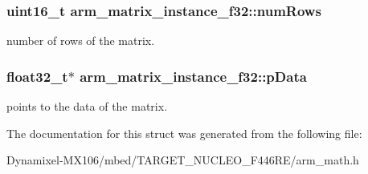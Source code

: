\subsubsection[{\texorpdfstring{num\+Rows}{numRows}}]{\setlength{\rightskip}{0pt plus 5cm}uint16\+\_\+t arm\+\_\+matrix\+\_\+instance\+\_\+f32\+::num\+Rows}\hypertarget{structarm__matrix__instance__f32_a23f4e34d70a82c9cad7612add5640b7b}{}\label{structarm__matrix__instance__f32_a23f4e34d70a82c9cad7612add5640b7b}
number of rows of the matrix. 
\subsubsection[{\texorpdfstring{p\+Data}{pData}}]{\setlength{\rightskip}{0pt plus 5cm}float32\+\_\+t$\ast$ arm\+\_\+matrix\+\_\+instance\+\_\+f32\+::p\+Data}\hypertarget{structarm__matrix__instance__f32_af3917c032600a9dfd5ed4a96f074910a}{}\label{structarm__matrix__instance__f32_af3917c032600a9dfd5ed4a96f074910a}
points to the data of the matrix. 

The documentation for this struct was generated from the following file\+:\begin{DoxyCompactItemize}
\item 
Dynamixel-\/\+M\+X106/mbed/\+T\+A\+R\+G\+E\+T\+\_\+\+N\+U\+C\+L\+E\+O\+\_\+\+F446\+R\+E/arm\+\_\+math.\+h\end{DoxyCompactItemize}
